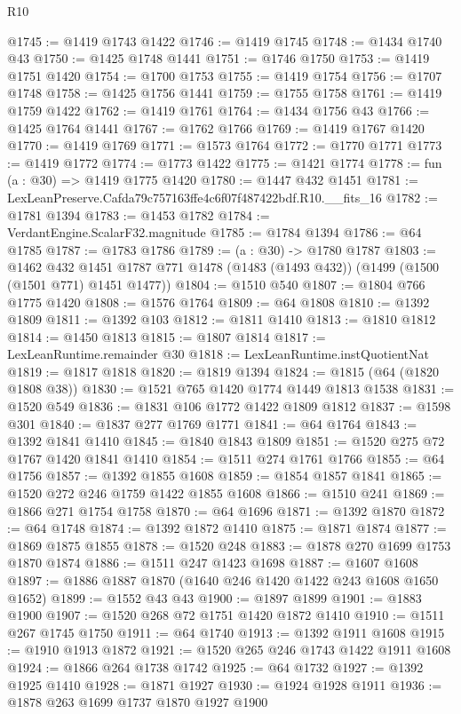 \begin{lexlean}{R10}
\begin{coremodule}
@1745 := @1419 @1743 @1422
@1746 := @1419 @1745
@1748 := @1434 @1740 @43
@1750 := @1425 @1748 @1441
@1751 := @1746 @1750
@1753 := @1419 @1751 @1420
@1754 := @1700 @1753
@1755 := @1419 @1754
@1756 := @1707 @1748
@1758 := @1425 @1756 @1441
@1759 := @1755 @1758
@1761 := @1419 @1759 @1422
@1762 := @1419 @1761
@1764 := @1434 @1756 @43
@1766 := @1425 @1764 @1441
@1767 := @1762 @1766
@1769 := @1419 @1767 @1420
@1770 := @1419 @1769
@1771 := @1573 @1764
@1772 := @1770 @1771
@1773 := @1419 @1772
@1774 := @1773 @1422
@1775 := @1421 @1774
@1778 := fun (a : @30) => @1419 @1775 @1420
@1780 := @1447 @432 @1451
@1781 := LexLeanPreserve.Cafda79c757163ffe4c6f07f487422bdf.R10.__fits_16
@1782 := @1781 @1394
@1783 := @1453 @1782
@1784 := VerdantEngine.ScalarF32.magnitude
@1785 := @1784 @1394
@1786 := @64 @1785
@1787 := @1783 @1786
@1789 := (a : @30) -> @1780 @1787
@1803 := @1462
    @432
    @1451
    @1787
    @771
    @1478
    (@1483 (@1493 @432))
    (@1499 (@1500 (@1501 @771) @1451 @1477))
@1804 := @1510 @540
@1807 := @1804 @766 @1775 @1420
@1808 := @1576 @1764
@1809 := @64 @1808
@1810 := @1392 @1809
@1811 := @1392 @103
@1812 := @1811 @1410
@1813 := @1810 @1812
@1814 := @1450 @1813
@1815 := @1807 @1814
@1817 := LexLeanRuntime.remainder @30
@1818 := LexLeanRuntime.instQuotientNat
@1819 := @1817 @1818
@1820 := @1819 @1394
@1824 := @1815 (@64 (@1820 @1808 @38))
@1830 := @1521 @765 @1420 @1774 @1449 @1813 @1538
@1831 := @1520 @549
@1836 := @1831 @106 @1772 @1422 @1809 @1812
@1837 := @1598 @301
@1840 := @1837 @277 @1769 @1771
@1841 := @64 @1764
@1843 := @1392 @1841 @1410
@1845 := @1840 @1843 @1809
@1851 := @1520 @275 @72 @1767 @1420 @1841 @1410
@1854 := @1511 @274 @1761 @1766
@1855 := @64 @1756
@1857 := @1392 @1855 @1608
@1859 := @1854 @1857 @1841
@1865 := @1520 @272 @246 @1759 @1422 @1855 @1608
@1866 := @1510 @241
@1869 := @1866 @271 @1754 @1758
@1870 := @64 @1696
@1871 := @1392 @1870
@1872 := @64 @1748
@1874 := @1392 @1872 @1410
@1875 := @1871 @1874
@1877 := @1869 @1875 @1855
@1878 := @1520 @248
@1883 := @1878 @270 @1699 @1753 @1870 @1874
@1886 := @1511 @247 @1423 @1698
@1887 := @1607 @1608
@1897 := @1886 @1887 @1870 (@1640 @246 @1420 @1422 @243 @1608 @1650 @1652)
@1899 := @1552 @43 @43
@1900 := @1897 @1899
@1901 := @1883 @1900
@1907 := @1520 @268 @72 @1751 @1420 @1872 @1410
@1910 := @1511 @267 @1745 @1750
@1911 := @64 @1740
@1913 := @1392 @1911 @1608
@1915 := @1910 @1913 @1872
@1921 := @1520 @265 @246 @1743 @1422 @1911 @1608
@1924 := @1866 @264 @1738 @1742
@1925 := @64 @1732
@1927 := @1392 @1925 @1410
@1928 := @1871 @1927
@1930 := @1924 @1928 @1911
@1936 := @1878 @263 @1699 @1737 @1870 @1927 @1900

\end{coremodule}
\end{lexlean}
